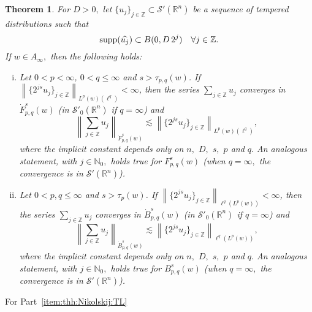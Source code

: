 \documentclass[12pt]{amsart}
\newtheorem{theorem}{Theorem}[section]
\theoremstyle{remark}
\newcommand{\naz}{\mathbb{N}_0}
\newcommand{\ent}{\mathbb{Z}}
\newcommand{\rn}{{{\mathbb R}^n}}
\newcommand{\swp}{{\mathcal{S}'}(\rn)}
\newcommand{\tlw}[4]{\dot F_{#1,#3}^{#2}(#4)} %
\newcommand{\itlw}[4]{F_{#1,#3}^{#2}(#4)} %
\newcommand{\besw}[4]{\dot B_{#1,#3}^{#2}(#4)} %
\newcommand{\ibesw}[4]{B_{#1,#3}^{#2}(#4)} %
\newcommand{\norm}[2]{\left\|#1\right\|_{#2}}
\newcommand{\supp}{{\rm{supp}}}
\newcommand{\A}{D}
\begin{document}
\begin{theorem}\label{thm:Nikolskij:weighted} For $\A> 0,$ let $\{u_j\}_{j \in \ent} \subset \mathcal{S}'(\rn)$ be a sequence of tempered distributions such that
\begin{equation*}
\supp(\widehat{u_j}) \subset B(0, \A\, 2^j ) \quad \forall j \in \ent.
\end{equation*}
If $w\in A_\infty,$ then the following holds:  
\begin{enumerate}[(i)]
\item\label{item:thh:Nikolskij:TL} Let $0 < p < \infty$, $0 < q \leq \infty$ and $s > \tau_{p,q}(w)$. If $\norm{\{2^{js} u_j\}_{j\in\ent}}{L^p(w)(\ell^{q})} < \infty$, then the series $\sum_{j \in \ent} u_j$ converges in $\tlw{p}{s}{q}{w}$ (in $\mathcal{S}'_0(\rn)$ if $q=\infty$) and 
\begin{equation*}
\norm{\sum_{j \in \ent} u_j}{\tlw{p}{s}{q}{w}} \lesssim  \norm{\{2^{js} u_j\}_{j\in\ent}}{L^p(w)(\ell^{q})},
\end{equation*}
where the implicit constant depends only on $n,$ $\A,$ $s,$ $p$ and  $q.$  An analogous statement, with $j\in\naz,$ holds true for $\itlw{p}{s}{q}{w}$ (when $q=\infty,$  the convergence is in $\swp$).
\item\label{item:thh:Nikolskij:B} Let $0 < p, q \leq \infty$ and $s > \tau_p(w)$. If $\norm{\{2^{js} u_j\}_{j\in\ent}}{\ell^{q}(L^p(w))} < \infty$, then the series $\sum_{j \in \ent} u_j$ converges in  $\besw{p}{s}{q}{w}$ (in $\mathcal{S}'_0(\rn)$ if $q=\infty$) and 
\begin{equation*}
\norm{\sum_{j \in \ent} u_j}{\besw{p}{s}{q}{w}} \lesssim  \norm{\{2^{js} u_j\}_{j\in\ent}}{\ell^{q}(L^p(w))},
\end{equation*}
where the implicit constant depends only on $n,$ $\A,$ $s,$ $p$ and $q.$   An analogous statement, with $j\in\naz,$ holds true for $\ibesw{p}{s}{q}{w}$ (when $q=\infty,$  the convergence is in $\swp$).
\end{enumerate}
\end{theorem}

For Part~\eqref{item:thh:Nikolskij:TL}

 
\end{document}
